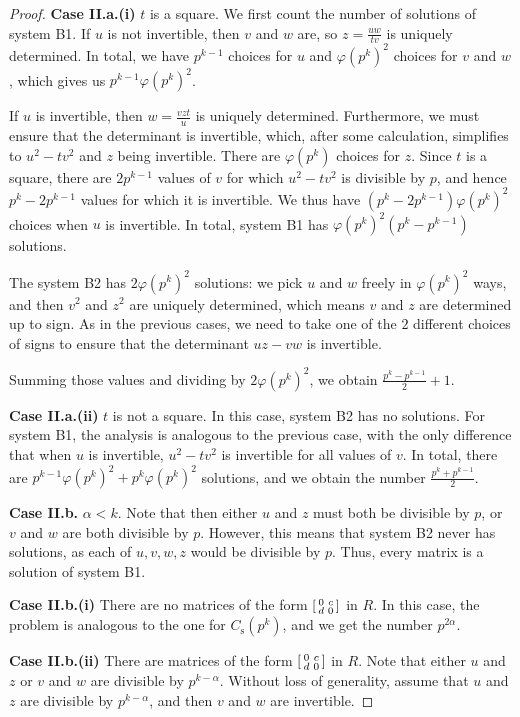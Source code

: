 \documentclass[10pt,leqno]{amsart}
\newcommand\sm[1]{\begin{bsmallmatrix}#1\end{bsmallmatrix}}
\theoremstyle{definition}
\theoremstyle{remark}
\numberwithin{theorem}{section}
\begin{document}
\begin{proof}
\noindent \textbf{Case II.a.(i)} $t$ is a square.
We first count the number of solutions of system B1. If $u$ is not invertible, then $v$ and $w$ are, so $z=\frac{uw}{tv}$ is uniquely determined. In total, we have $p^{k-1}$ choices for $u$ and $\varphi(p^k)^2$ choices for $v$ and $w$, which gives us $p^{k-1}\varphi(p^k)^2$.

If $u$ is invertible, then $w=\frac{vzt}{u}$ is uniquely determined. Furthermore, we must ensure that the determinant is invertible, which, after some calculation, simplifies to $u^2-tv^2$ and $z$ being invertible. There are $\varphi(p^k)$ choices for $z$. Since $t$ is a square, there are $2p^{k-1}$ values of $v$ for which $u^2-tv^2$ is divisible by $p$, and hence $p^k-2p^{k-1}$ values for which it is invertible. We thus have $(p^k-2p^{k-1})\varphi(p^k)^2$ choices when $u$ is invertible. In total, system B1 has $\varphi(p^k)^2(p^k-p^{k-1})$ solutions.


The system B2 has $2\varphi(p^k)^2$  solutions: we pick $u$ and $w$ freely in $\varphi(p^k)^2$ ways, and then $v^2$ and $z^2$ are uniquely determined, which means $v$ and $z$ are determined up to sign. As in the previous cases, we need to take one of the $2$ different choices of signs to ensure that the determinant $uz-vw$ is invertible. 

Summing those values and dividing by $2\varphi(p^k)^2$, we obtain $\frac{p^k-p^{k-1}}{2}+1$.

\noindent \textbf{Case II.a.(ii)} $t$ is not a square. In this case, system B2 has no solutions. For system B1, the analysis is analogous to the previous case, with the only difference that when $u$ is invertible, $u^2-tv^2$ is invertible for all values of $v$. In total, there are $p^{k-1}\varphi(p^k)^2+p^k\varphi(p^k)^2$ solutions, and we obtain the number $\frac{p^k+p^{k-1}}{2}$.
 

\noindent \textbf{Case II.b.} $\alpha<k$. 
Note that then either $u$ and $z$ must both be divisible by $p$, or $v$ and $w$ are both divisible by $p$. However, this means that system B2 never has solutions, as each of $u,v,w,z$ would be divisible by $p$. Thus, every matrix is a solution of system B1.

\noindent \textbf{Case II.b.(i)} There are no matrices of the form $\sm{0 & c \\ d & 0}$ in $R$. In this case, the problem is analogous to the one for $C_{\mathrm s}(p^k)$, and we get the number $p^{2\alpha}$.

\noindent \textbf{Case II.b.(ii)} There are matrices of the form $\sm{0 & c \\d & 0}$ in $R$. 
Note that either $u$ and $z$ or $v$ and $w$ are divisible by $p^{k-\alpha}$. Without loss of generality, assume that $u$ and $z$ are divisible by $p^{k-\alpha}$, and then $v$ and $w$ are invertible.


\end{proof}
\end{document}
